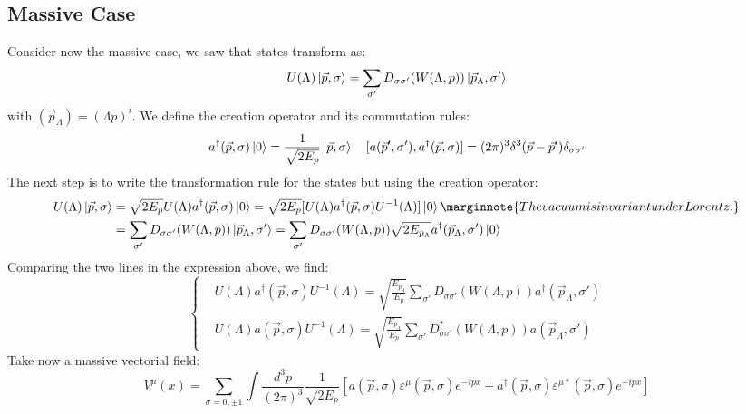 \documentclass[../main.tex]{subfiles}
\begin{document}
\subsection{Massive Case}
Consider now the massive case, we saw that states transform as:
\[
U(\Lambda)\ket{\vec{p},\sigma}=\sum_{\sigma'}D_{\sigma\sigma'}(W(\Lambda,p))\ket{\vec{p}_\Lambda,\sigma'}
\]
with $(\Vec{p}_\Lambda)=(\Lambda p)^i$. We define the creation operator and its commutation rules:
\[
a^\dagger(\vec{p},\sigma)\ket{0}=\frac{1}{\sqrt{2E_p}}\ket{\vec{p},\sigma} \quad [a(\vec{p}',\sigma'),a^\dagger(\vec{p},\sigma)]=(2\pi)^3\delta^3(\vec{p}-\vec{p}')\delta_{\sigma\sigma'}
\]
The next step is to write the transformation rule for the states but using the creation operator:
\begin{align*}
U(\Lambda)\ket{\vec{p},\sigma}&=\sqrt{2E_p}U(\Lambda)a^\dagger(\vec{p},\sigma)\ket{0}=\sqrt{2E_p}[U(\Lambda)a^\dagger(\vec{p},\sigma)U^{-1}(\Lambda)]\ket{0}\marginnote{The vacuum is invariant under Lorentz.}\\
&=\sum_{\sigma'}D_{\sigma\sigma'}(W(\Lambda,p))\ket{\vec{p}_\Lambda,\sigma'}=\sum_{\sigma'}D_{\sigma\sigma'}(W(\Lambda,p))\sqrt{2E_{p_\Lambda}}a^\dagger(\vec{p}_\Lambda,\sigma')\ket{0}
\end{align*}
Comparing the two lines in the expression above, we find:
\[
\left\{
\begin{aligned}
&U(\Lambda)a^\dagger(\vec{p},\sigma)U^{-1}(\Lambda)=\sqrt{\frac{E_{p_\Lambda}}{E_p}}\sum_{\sigma'}D_{\sigma\sigma'}(W(\Lambda,p))a^\dagger(\vec{p}_\Lambda,\sigma')\\
&U(\Lambda)a(\vec{p},\sigma)U^{-1}(\Lambda)=\sqrt{\frac{E_{p_\Lambda}}{E_p}}\sum_{\sigma'}D_{\sigma\sigma'}^*(W(\Lambda,p))a(\vec{p}_\Lambda,\sigma')
\end{aligned}
\right.
\]
Take now a massive vectorial field:
\[
V^\mu(x)=\sum_{\sigma=0,\pm1}\int\frac{d^3p}{(2\pi)^3}\frac{1}{\sqrt{2E_p}}\left[a(\vec{p},\sigma)\varepsilon^\mu(\vec{p},\sigma)e^{-ipx}+a^\dagger(\vec{p},\sigma)\varepsilon^{\mu*}(\vec{p},\sigma)e^{+ipx}\right]
\]
\end{document}

